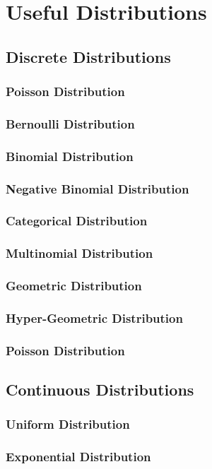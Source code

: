 \chapter{Useful Distributions}
\section{Discrete Distributions}
\subsection{Poisson Distribution}
\subsection{Bernoulli Distribution}
\subsection{Binomial Distribution}
\subsection{Negative Binomial Distribution}
\subsection{Categorical Distribution}
\subsection{Multinomial Distribution}
\subsection{Geometric Distribution}
\subsection{Hyper-Geometric Distribution}
\subsection{Poisson Distribution}
\section{Continuous Distributions}
\subsection{Uniform Distribution}
\subsection{Exponential Distribution}
